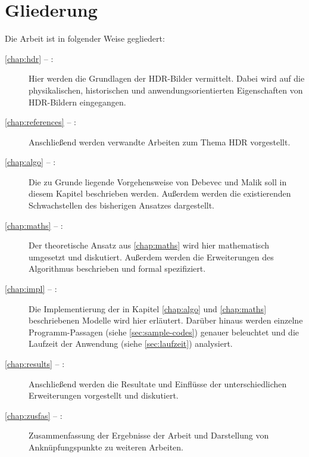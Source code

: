 \section{Gliederung}
Die Arbeit ist in folgender Weise gegliedert:
\begin{description}

\item[\autoref{chap:hdr} -- :] Hier werden die Grundlagen der \gls{HDR}-Bilder vermittelt. Dabei wird auf die physikalischen, historischen und anwendungsorientierten Eigenschaften von \gls{HDR}-Bildern eingegangen.

\item[\autoref{chap:references} -- :] Anschließend werden verwandte Arbeiten zum Thema \gls{HDR} vorgestellt.

\item[\autoref{chap:algo} -- :] Die zu Grunde liegende Vorgehensweise von Debevec und Malik \cite{paper} soll in diesem Kapitel beschrieben werden. Außerdem werden die existierenden Schwachstellen des bisherigen Ansatzes dargestellt.

\item[\autoref{chap:maths} -- :] Der theoretische Ansatz aus \autoref{chap:maths} wird hier mathematisch umgesetzt und diskutiert. Außerdem werden die Erweiterungen des Algorithmus beschrieben und formal spezifiziert.

\item[\autoref{chap:impl} -- :] Die Implementierung der in Kapitel \autoref{chap:algo} und \autoref{chap:maths} beschriebenen Modelle wird hier erläutert. Darüber hinaus werden einzelne Programm-Passagen (siehe \autoref{sec:sample-codes}) genauer beleuchtet und die Laufzeit der Anwendung (siehe \autoref{sec:laufzeit}) analysiert.

\item[\autoref{chap:results} -- :] Anschließend werden die Resultate und Einflüsse der unterschiedlichen Erweiterungen vorgestellt und diskutiert.

\item[\autoref{chap:zusfas} -- :] Zusammenfassung der Ergebnisse der Arbeit und Darstellung von Anknüpfungspunkte zu weiteren Arbeiten.
\end{description}

